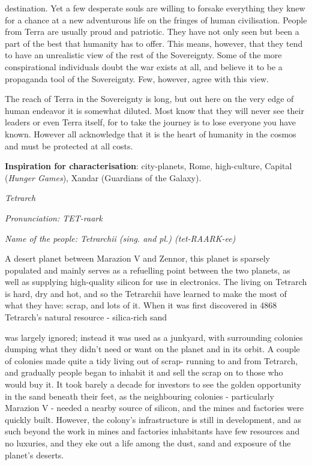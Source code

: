 \documentclass{scrbook}
\begin{document}
destination. Yet a few desperate souls are willing to forsake everything they knew for a chance at a new adventurous life on the fringes of human civilisation. People from Terra are usually proud and patriotic. They have not only seen but been a part of the best that humanity has to offer. This means, however, that they tend to have an unrealistic view of the rest of the Sovereignty. Some of the more conspirational individuals doubt the war exists at all, and believe it to be a propaganda tool of the Sovereignty. Few, however, agree with this view.

The reach of Terra in the Sovereignty is long, but out here on the very edge of human endeavor it is somewhat diluted. Most know that they will never see their leaders or even Terra itself, for to take the journey is to lose everyone you have known. However all acknowledge that it is the heart of humanity in the cosmos and must be protected at all costs.

\textbf{Inspiration for characterisation}: city-planets, Rome, high-culture, Capital (\textit{Hunger Games}), Xandar (Guardians of the Galaxy).

\textit{Tetrarch}

\textit{Pronunciation: TET-raark}

\textit{Name of the people: Tetrarchii (sing. and pl.) (tet-RAARK-ee)}

A desert planet between Marazion V and Zennor, this planet is sparsely populated and mainly serves as a refuelling point between the two planets, as well as supplying high-quality silicon for use in electronics. The living on Tetrarch is hard, dry and hot, and so the Tetrarchii have learned to make the most of what they have: scrap, and lots of it. When it was first discovered in 4868 Tetrarch's natural resource - silica-rich sand

was largely ignored; instead it was used as a junkyard, with surrounding colonies dumping what they didn't need or want on the planet and in its orbit. A couple of colonies made quite a tidy living out of scrap- running to and from Tetrarch, and gradually people began to inhabit it and sell the scrap on to those who would buy it. It took barely a decade for investors to see the golden opportunity in the sand beneath their feet, as the neighbouring colonies - particularly Marazion V - needed a nearby source of silicon, and the mines and factories were quickly built. However, the colony's infrastructure is still in development, and as such beyond the work in mines and factories inhabitants have few resources and no luxuries, and they eke out a life among the dust, sand and exposure of the planet's deserts.
\end{document}

